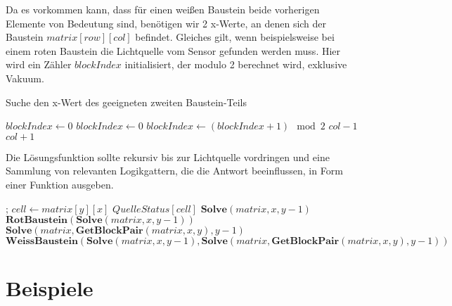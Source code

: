 \documentclass[a4paper,10pt,ngerman]{scrartcl}
\begin{document}
Da es vorkommen kann, dass für einen weißen Baustein beide vorherigen Elemente von Bedeutung sind, benötigen wir 2 x-Werte, an denen sich der Baustein $matrix[row][col]$ befindet. Gleiches gilt, wenn beispielsweise bei einem roten Baustein die Lichtquelle vom Sensor gefunden werden muss. Hier wird ein Zähler $blockIndex$ initialisiert, der modulo 2 berechnet wird, exklusive Vakuum.

\begin{algorithm}
    \caption{Suche den x-Wert des geeigneten zweiten Baustein-Teils}
    \begin{algorithmic}
        \State $blockIndex \gets 0$
        \State $blockIndex \gets 0$
        \Else
        \State $blockIndex \gets (blockIndex + 1) \mod 2$
        \EndIf
        \EndFor
        \State \Return $col - 1$
        \Else
        \State \Return $col + 1$
        \EndIf
        \EndFunction
    \end{algorithmic}
\end{algorithm}

Die Lösungsfunktion sollte rekursiv bis zur Lichtquelle vordringen und eine Sammlung von relevanten Logikgattern, die die Antwort beeinflussen, in Form einer Funktion ausgeben.

\begin{algorithmic}
        \State \Return \FALSE;
        \EndIf
        \State $cell \gets matrix[y][x]$
        \State \Return $QuelleStatus[cell]$
        \State \Return $\textbf{Solve}(matrix, x, y - 1)$
        \State \Return $\textbf{RotBaustein}(\textbf{Solve}(matrix, x, y - 1))$
        \State \Return $\textbf{Solve}(matrix, \textbf{GetBlockPair}(matrix, x, y), y - 1)$
        \State \Return $\textbf{WeissBaustein}(\textbf{Solve}(matrix, x, y - 1), \textbf{Solve}(matrix, \textbf{GetBlockPair}(matrix, x, y), y - 1))$
        \EndIf
        \EndFunction
    \end{algorithmic}

\vspace{0.5cm}

\newpage
\section{Beispiele}
\end{document}
